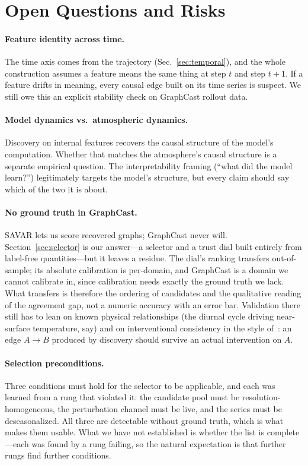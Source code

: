 \section{Open Questions and Risks}
\label{sec:open}

\paragraph{Feature identity across time.} The time axis comes from the trajectory
(Sec.~\ref{sec:temporal}), and the whole construction assumes a feature means the
same thing at step $t$ and step $t{+}1$. If a feature drifts in meaning, every
causal edge built on its time series is suspect. We still owe this an explicit
stability check on GraphCast rollout data.

\paragraph{Model dynamics vs.\ atmospheric dynamics.} Discovery on internal
features recovers the causal structure of the model's computation. Whether that
matches the atmosphere's causal structure is a separate empirical question. The
interpretability framing (``what did the model learn?'') legitimately targets the
model's structure, but every claim should say which of the two it is about.

\paragraph{No ground truth in GraphCast.} SAVAR lets us score recovered graphs;
GraphCast never will. Section~\ref{sec:selector} is our answer---a selector and a
trust dial built entirely from label-free quantities---but it leaves a residue.
The dial's ranking transfers out-of-sample; its absolute calibration is
per-domain, and GraphCast is a domain we cannot calibrate in, since calibration
needs exactly the ground truth we lack. What transfers is therefore the ordering
of candidates and the qualitative reading of the agreement gap, not a numeric
accuracy with an error bar. Validation there still has to lean on known physical
relationships (the diurnal cycle driving near-surface temperature, say) and on
interventional consistency in the style of~\cite{macmillan2025}: an edge
$A \to B$ produced by discovery should survive an actual intervention on $A$.

\paragraph{Selection preconditions.} Three conditions must hold for the selector
to be applicable, and each was learned from a rung that violated it: the candidate
pool must be resolution-homogeneous, the perturbation channel must be live, and
the series must be deseasonalized. All three are detectable without ground truth,
which is what makes them usable. What we have not established is whether the list
is complete---each was found by a rung failing, so the natural expectation is that
further rungs find further conditions.

